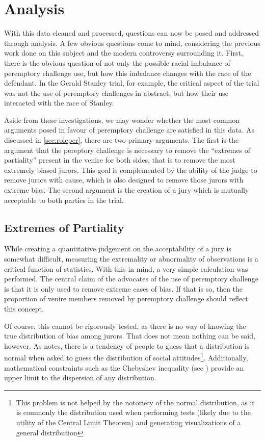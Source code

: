 \chapter{Analysis} \label{c:analysis}

With this data cleaned and processed, questions can now be posed and addressed through analysis. A few obvious questions come to
mind, considering the previous work done on this subject and the modern controversy surrounding it. First, there is the obvious
question of not only the possible racial imbalance of peremptory challenge use, but how this imbalance changes with the race of
the defendant. In the Gerald Stanley trial, for example, the critical aspect of the trial was not the use of peremptory challenges
in abstract, but how their use interacted with the race of Stanley.

Aside from these investigations, we may wonder whether the most common arguments posed in favour of peremptory challenge are
satisfied in this data. As discussed in \ref{sec:roleper}, there are two primary arguments. The first is the argument that the
pereptory challenge is necessary to remove the ``extremes of partiality'' present in the venire for both sides, that is to remove
the most extremely biased jurors. This goal is complemented by the ability of the judge to remove jurors with cause, which is also
designed to remove those jurors with extreme bias. The second argument is the creation of a jury which is mutually acceptable to
both parties in the trial.

\section{Extremes of Partiality} \label{sec:extremes}

While creating a quantitative judgement on the acceptability of a jury is somewhat difficult, measuring the extremality or
abnormality of observations is a critical function of statistics. With this in mind, a very simple calculation was performed. The
central claim of the advocates of the use of peremptory challenge is that it is only used to remove extreme cases of bias. If that
is so, then the proportion of venire members removed by peremptory challenge should reflect this concept.

Of course, this cannot be rigorously tested, as there is no way of knowing the true distribution of bias among jurors. That does
not mean nothing can be said, however. As \cite{nisbett1985} notes, there is a tendency of people to guess that a distribution is
normal when asked to guess the distribution of social attitudes\footnote{This problem is not helped by the notoriety of the normal
  distribution, as it is commonly the distribution used when performing tests (likely due to the utility of the Central Limit
  Theorem) and generating visualizations of a general distribution}. Additionally, mathematical constraints such as the Chebyshev
inequality (see \cite{chebyshev}) provide an upper limit to the dispersion of any distribution.

